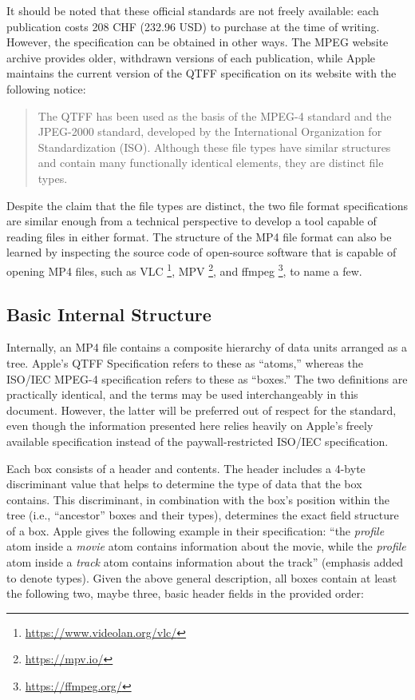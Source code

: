 It should be noted that these official standards are not freely available: each publication costs 208 CHF (232.96 USD) to purchase at the time of writing. However, the specification can be obtained in other ways. The MPEG website archive \cite{mpeg} provides older, withdrawn versions of each publication, while Apple maintains the current version of the QTFF specification on its website with the following notice:
\begin{quote}
	The QTFF has been used as the basis of the MPEG-4 standard and the JPEG-2000 standard, developed by the International Organization for Standardization (ISO). Although these file types have similar structures and contain many functionally identical elements, they are distinct file types. \cite{apple2016}
\end{quote}
Despite the claim that the file types are distinct, the two file format specifications are similar enough from a technical perspective to develop a tool capable of reading files in either format. The structure of the MP4 file format can also be learned by inspecting the source code of open-source software that is capable of opening MP4 files, such as VLC \footnote{\url{https://www.videolan.org/vlc/}}, MPV \footnote{\url{https://mpv.io/}}, and ffmpeg \footnote{\url{https://ffmpeg.org/}}, to name a few.

\subsection{Basic Internal Structure}

Internally, an MP4 file contains a composite hierarchy of data units arranged as a tree. Apple's QTFF Specification \cite{apple2016} refers to these as ``atoms,'' whereas the ISO/IEC MPEG-4 specification refers to these as ``boxes.'' The two definitions are practically identical, and the terms may be used interchangeably in this document. However, the latter will be preferred out of respect for the standard, even though the information presented here relies heavily on Apple's freely available specification instead of the paywall-restricted ISO/IEC specification.

Each box consists of a header and contents. The header includes a 4-byte discriminant value that helps to determine the type of data that the box contains. This discriminant, in combination with the box's position within the tree (i.e., ``ancestor'' boxes and their types), determines the exact field structure of a box. Apple gives the following example in their specification: ``the \emph{profile} atom inside a \emph{movie} atom contains information about the movie, while the \emph{profile} atom inside a \emph{track} atom contains information about the track'' (emphasis added to denote types). Given the above general description, all boxes contain at least the following two, maybe three, basic header fields in the provided order:

